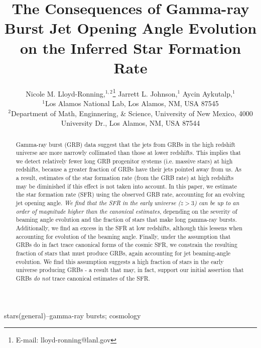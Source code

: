 \documentclass[fleqn,usenatbib,useAMS]{mnras}
\title[High z SFR from GRBs]{The Consequences of Gamma-ray Burst Jet Opening Angle Evolution on the Inferred Star Formation Rate}
\author[Lloyd-Ronning et al.]{Nicole M. Lloyd-Ronning,$^{1,2}$\thanks{E-mail: lloyd-ronning@lanl.gov}
Jarrett L. Johnson,$^{1}$
Aycin Aykutalp,$^{1}$
\newauthor
\\
$^{1}$Los Alamos National Lab, Los Alamos, NM, USA 87545\\
$^{2}$Department of Math, Enginnering, \& Science, University of New Mexico, 4000 University Dr., Los Alamos, NM, USA 87544\\
}
\begin{document}
\label{firstpage}
\pagerange{\pageref{firstpage}--\pageref{lastpage}}
\maketitle

\begin{abstract}
 Gamma-ray burst (GRB) data suggest that the jets from GRBs in the high redshift universe are more narrowly collimated than those at lower redshifts.  This implies that we detect relatively fewer long GRB progenitor systems (i.e. massive stars) at high redshifts, because a greater fraction of GRBs have their jets pointed away from us.  As a result, estimates of the star formation rate (from the GRB rate) at high redshifts may be diminished if this effect is not taken into account.  In this paper, we estimate the star formation rate (SFR) using the observed GRB rate, accounting for an evolving jet opening angle.  {\em We find that the SFR in the early universe ($z > 3$) can be up to an order of magnitude higher than the canonical estimates}, depending on the severity of beaming angle evolution and the fraction of stars that make long gamma-ray bursts. Additionally, we find an excess in the SFR at low redshifts, although this lessens when accounting for evolution of the beaming angle.   Finally, under the assumption that GRBs do in fact trace canonical forms of the cosmic SFR, we constrain the resulting fraction of stars that must produce GRBs, again accounting for jet beaming-angle evolution. We find this assumption suggests a high fraction of stars in the early universe producing GRBs - a result that may, in fact, support our initial assertion that GRBs {\em do not} trace canonical estimates of the SFR.   
  
\end{abstract}

\begin{keywords}
stars(general)--gamma-ray bursts; cosmology
\end{keywords}



\end{document}
